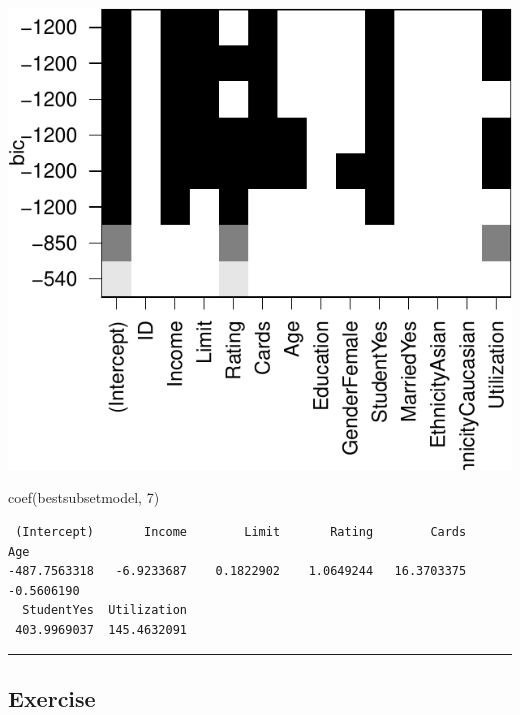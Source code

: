 \documentclass[
]{article}
\newenvironment{Shaded}{\begin{snugshade}}{\end{snugshade}}
\newcommand{\DecValTok}[1]{\textcolor[rgb]{0.00,0.00,0.81}{#1}}
\newcommand{\FunctionTok}[1]{\textcolor[rgb]{0.00,0.00,0.00}{#1}}
\newcommand{\NormalTok}[1]{#1}
\begin{document}
\begin{center}\includegraphics{SDM-CHAP24_files/figure-latex/unnamed-chunk-6-4} \end{center}

\begin{Shaded}
\begin{Highlighting}[]
\FunctionTok{coef}\NormalTok{(bestsubsetmodel, }\DecValTok{7}\NormalTok{)}
\end{Highlighting}
\end{Shaded}

\begin{verbatim}
 (Intercept)       Income        Limit       Rating        Cards          Age 
-487.7563318   -6.9233687    0.1822902    1.0649244   16.3703375   -0.5606190 
  StudentYes  Utilization 
 403.9969037  145.4632091 
\end{verbatim}

\begin{center}\rule{0.5\linewidth}{0.5pt}\end{center}

\hypertarget{exercise}{%
\subsection{Exercise}\label{exercise}}
\end{document}
